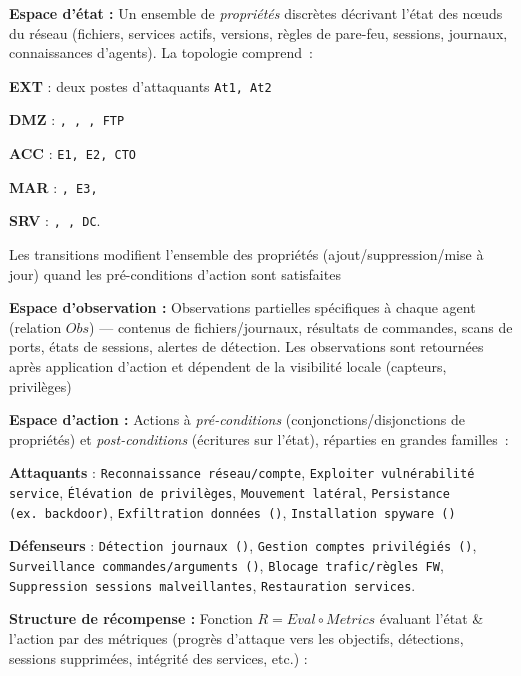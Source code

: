 \begin{enumerate*}[label={\roman*)}, itemjoin={; \quad}]
  \item \textbf{Espace d'état :} Un ensemble de \emph{propriétés} discrètes décrivant l’état des nœuds du réseau (fichiers, services actifs, versions, règles de pare-feu, sessions, journaux, connaissances d’agents). La topologie comprend~:
  \begin{enumerate*}[label={\alph*)}, itemjoin={; \ }]
    \item \textbf{EXT} : deux postes d’attaquants \texttt{At1, At2}
    \item \textbf{DMZ} : \texttt{, , , FTP}
    \item \textbf{ACC} : \texttt{E1, E2, CTO}
    \item \textbf{MAR} : \texttt{, E3, }
    \item \textbf{SRV} : \texttt{, , DC}.
  \end{enumerate*}
  Les transitions modifient l’ensemble des propriétés (ajout/suppression/mise à jour) quand les pré-conditions d’action sont satisfaites
  \item \textbf{Espace d'observation :} Observations partielles spécifiques à chaque agent (relation $Obs$) — contenus de fichiers/journaux, résultats de commandes, scans de ports, états de sessions, alertes de détection. Les observations sont retournées après application d’action et dépendent de la visibilité locale (capteurs, privilèges)
  \item \textbf{Espace d'action :} Actions à \emph{pré-conditions} (conjonctions/disjonctions de propriétés) et \emph{post-conditions} (écritures sur l’état), réparties en grandes familles~:
  \begin{enumerate*}[label={\alph*)}, itemjoin={; \ }]
    \item \textbf{Attaquants} : \texttt{Reconnaissance réseau/compte}, \texttt{Exploiter vulnérabilité service}, \texttt{Élévation de privilèges}, \texttt{Mouvement latéral}, \texttt{Persistance (ex.~backdoor)}, \texttt{Exfiltration données ()}, \texttt{Installation spyware ()}
    \item \textbf{Défenseurs} : \texttt{Détection journaux ()}, \texttt{Gestion comptes privilégiés ()}, \texttt{Surveillance commandes/arguments ()}, \texttt{Blocage trafic/règles FW}, \texttt{Suppression sessions malveillantes}, \texttt{Restauration services}.
  \end{enumerate*}
  \item \textbf{Structure de récompense :} Fonction $R = Eval \circ Metrics$ évaluant l’état \& l’action par des métriques (progrès d’attaque vers les objectifs, détections, sessions supprimées, intégrité des services, etc.) :

\end{enumerate*}
